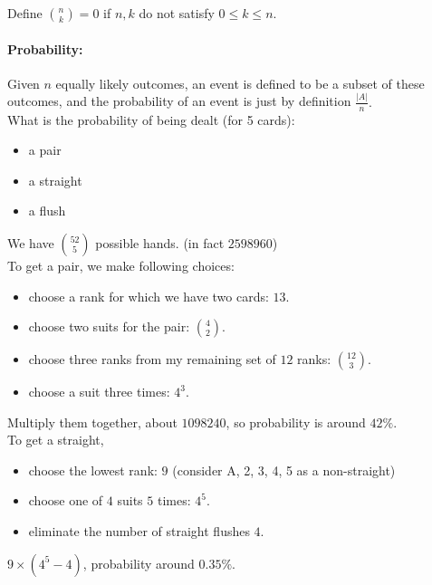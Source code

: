 \documentclass[a4paper, 11pt, twoside]{article}
\begin{document}
Define ${n \choose k}=0$ if $n,k$ do not satisfy $0\leq k\leq n.$\\

\paragraph{Probability:} Given $n$ equally likely outcomes, an event is defined to be a subset of these outcomes, and the probability of an event is just by definition $\frac{|A|}{n}.$\\

What is the probability of being dealt (for 5 cards):

\begin{itemize}
	\item a pair
	\item a straight
	\item a flush
\end{itemize}

We have ${52 \choose 5}$ possible hands. (in fact $2598960$)\\

To get a pair, we make following choices:
\begin{itemize}
	\item choose a rank for which we have two cards: $13$.
	\item choose two suits for the pair: ${4 \choose 2}$.
	\item choose three ranks from my remaining set of $12$ ranks: ${12 \choose 3}$.
	\item choose a suit three times: $4^3$.
\end{itemize}

Multiply them together, about $1098240$, so probability is around $42\%$.\\

To get a straight,
\begin{itemize}
	\item choose the lowest rank: $9$ (consider A, 2, 3, 4, 5 as a non-straight)
	\item choose one of $4$ suits $5$ times: $4^5$.
	\item eliminate the number of straight flushes $4$.
\end{itemize}

$9\times(4^5-4)$, probability around $0.35\%$.
\end{document}
